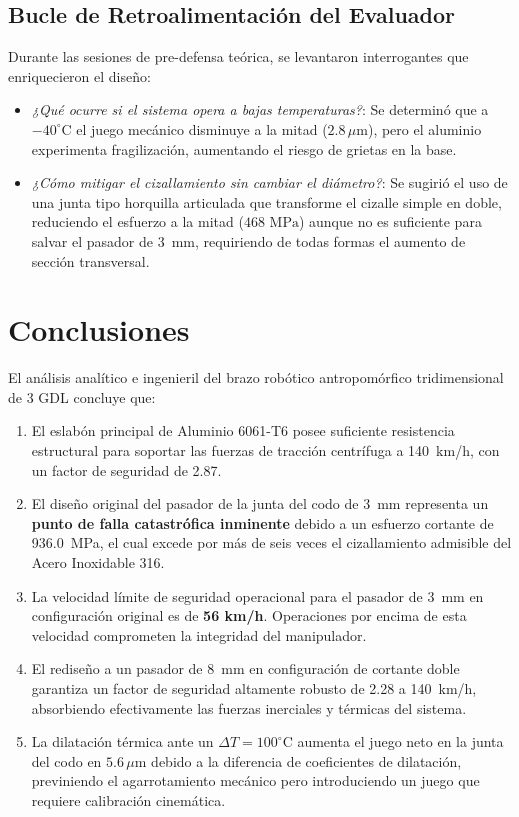 \documentclass[11pt,a4paper]{article}
\begin{document}
\subsection{Bucle de Retroalimentación del Evaluador}
Durante las sesiones de pre-defensa teórica, se levantaron interrogantes que enriquecieron el diseño:
\begin{itemize}
    \item \textit{¿Qué ocurre si el sistema opera a bajas temperaturas?}: Se determinó que a $-40^\circ$C el juego mecánico disminuye a la mitad ($2.8\,\mu\text{m}$), pero el aluminio experimenta fragilización, aumentando el riesgo de grietas en la base.
    \item \textit{¿Cómo mitigar el cizallamiento sin cambiar el diámetro?}: Se sugirió el uso de una junta tipo horquilla articulada que transforme el cizalle simple en doble, reduciendo el esfuerzo a la mitad ($468\text{ MPa}$) aunque no es suficiente para salvar el pasador de 3~mm, requiriendo de todas formas el aumento de sección transversal.
\end{itemize}

\section{Conclusiones}
El análisis analítico e ingenieril del brazo robótico antropomórfico tridimensional de 3 GDL concluye que:
\begin{enumerate}
    \item El eslabón principal de Aluminio 6061-T6 posee suficiente resistencia estructural para soportar las fuerzas de tracción centrífuga a 140~km/h, con un factor de seguridad de 2.87.
    \item El diseño original del pasador de la junta del codo de 3~mm representa un \textbf{punto de falla catastrófica inminente} debido a un esfuerzo cortante de 936.0~MPa, el cual excede por más de seis veces el cizallamiento admisible del Acero Inoxidable 316.
    \item La velocidad límite de seguridad operacional para el pasador de 3~mm en configuración original es de \textbf{56 km/h}. Operaciones por encima de esta velocidad comprometen la integridad del manipulador.
    \item El rediseño a un pasador de 8~mm en configuración de cortante doble garantiza un factor de seguridad altamente robusto de 2.28 a 140~km/h, absorbiendo efectivamente las fuerzas inerciales y térmicas del sistema.
    \item La dilatación térmica ante un $\Delta T = 100^\circ$C aumenta el juego neto en la junta del codo en $5.6\,\mu\text{m}$ debido a la diferencia de coeficientes de dilatación, previniendo el agarrotamiento mecánico pero introduciendo un juego que requiere calibración cinemática.
\end{enumerate}
\end{document}
